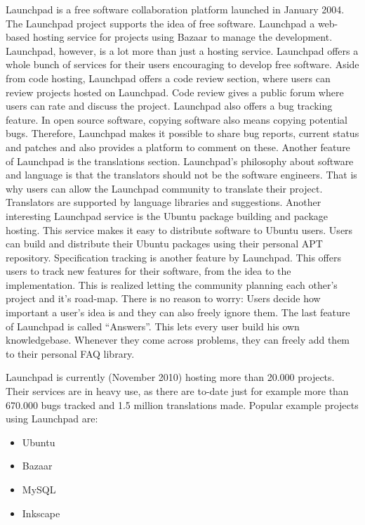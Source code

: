 Launchpad is a free software collaboration platform launched in January 2004. The Launchpad project supports the idea of free software. Launchpad a web-based hosting service for projects using Bazaar to manage the development. Launchpad, however, is a lot more than just a hosting service. Launchpad offers a whole bunch of services for their users encouraging to develop free software. Aside from code hosting, Launchpad offers a code review section, where users can review projects hosted on Launchpad. Code review gives a public forum where users can rate and discuss the project. Launchpad also offers a bug tracking feature. In open source software, copying software also means copying potential bugs. Therefore, Launchpad makes it possible to share bug reports, current status and patches and also provides a platform to comment on these.
Another feature of Launchpad is the translations section. Launchpad's philosophy about software and language is that the translators should not be the software engineers. That is why users can allow the Launchpad community to translate their project. Translators are supported by language libraries and suggestions.
Another interesting Launchpad service is the Ubuntu package building and package hosting. This service makes it easy to distribute software to Ubuntu users. Users can build and distribute their Ubuntu packages using their personal APT repository.
Specification tracking is another feature by Launchpad. This offers users to track new features for their software, from the idea to the implementation. This is realized letting the community planning each other's project and it's road-map. There is no reason to worry: Users decide how important a user's idea is and they can also freely ignore them. The last feature of Launchpad is called "`Answers"'. This lets every user build his own knowledgebase. Whenever they come across problems, they can freely add them to their personal FAQ library.

Launchpad is currently (November 2010) hosting more than 20.000 projects. Their services are in heavy use, as there are to-date just for example more than 670.000 bugs tracked and 1.5 million translations made.
\newline
Popular example projects using Launchpad are:

\begin{itemize}
	\item Ubuntu
	\item Bazaar
	\item MySQL
	\item Inkscape
\end{itemize}

